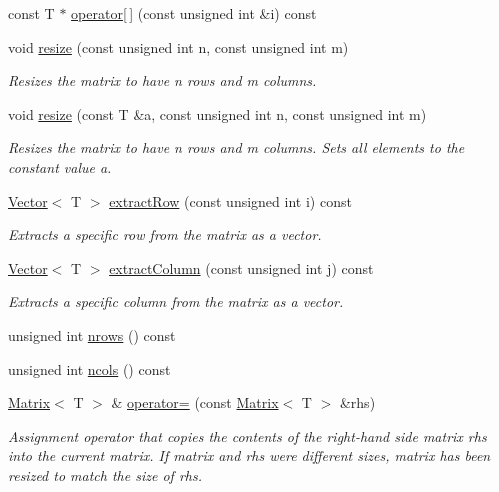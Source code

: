 \begin{DoxyCompactItemize}
\item 
const T $\ast$ \mbox{\hyperlink{classMatrix_af58cf6372d17f7abf5396d32f3ef5cd7}{operator\mbox{[}$\,$\mbox{]}}} (const unsigned int \&i) const
\item 
void \mbox{\hyperlink{classMatrix_a8d10454cfe9427269b54a754262004b8}{resize}} (const unsigned int n, const unsigned int m)
\begin{DoxyCompactList}\small\item\em Resizes the matrix to have {\ttfamily n} rows and {\ttfamily m} columns. \end{DoxyCompactList}\item 
void \mbox{\hyperlink{classMatrix_ae866a1b312aa040b587b40c5f54b6a54}{resize}} (const T \&a, const unsigned int n, const unsigned int m)
\begin{DoxyCompactList}\small\item\em Resizes the matrix to have {\ttfamily n} rows and {\ttfamily m} columns. Sets all elements to the constant value {\ttfamily a}. \end{DoxyCompactList}\item 
\mbox{\hyperlink{classVector}{Vector}}$<$ T $>$ \mbox{\hyperlink{classMatrix_a7dded77c0f4c424c98858b5f94c13c16}{extract\+Row}} (const unsigned int i) const
\begin{DoxyCompactList}\small\item\em Extracts a specific row from the matrix as a vector. \end{DoxyCompactList}\item 
\mbox{\hyperlink{classVector}{Vector}}$<$ T $>$ \mbox{\hyperlink{classMatrix_a4361c4478b01f7df1173e5b64eccd127}{extract\+Column}} (const unsigned int j) const
\begin{DoxyCompactList}\small\item\em Extracts a specific column from the matrix as a vector. \end{DoxyCompactList}\item 
unsigned int \mbox{\hyperlink{classMatrix_ad025820349fa69f73f2da395af627741}{nrows}} () const
\item 
unsigned int \mbox{\hyperlink{classMatrix_aa62107f075998f969b39fcb1bef20c44}{ncols}} () const
\item 
\mbox{\hyperlink{classMatrix}{Matrix}}$<$ T $>$ \& \mbox{\hyperlink{classMatrix_a01990eb2552555d37c83272125be68e6}{operator=}} (const \mbox{\hyperlink{classMatrix}{Matrix}}$<$ T $>$ \&rhs)
\begin{DoxyCompactList}\small\item\em Assignment operator that copies the contents of the right-\/hand side matrix {\ttfamily rhs} into the current matrix. If matrix and rhs were different sizes, matrix has been resized to match the size of {\ttfamily rhs}. \end{DoxyCompactList}\item 

\end{DoxyCompactItemize}
